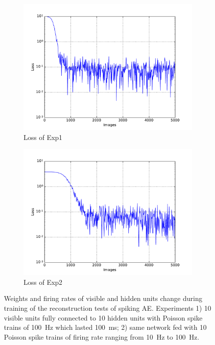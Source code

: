 \begin{figure}
\begin{subfigure}[t]{0.4\textwidth}
		\includegraphics[width=\textwidth]{pics_sdlm/01_exp_SAE_Orig_long/exp1_mse_nons.pdf}
		\caption{Loss of Exp1}
	\end{subfigure}
	\begin{subfigure}[t]{0.4\textwidth}
		\includegraphics[width=\textwidth]{pics_sdlm/01_exp_SAE_Orig_long/exp2_mse_nons.pdf}
		\caption{Loss of Exp2}
	\end{subfigure}
	\caption{Weights and firing rates of visible and hidden units change during training of the reconstruction tests of spiking AE. 
		Experiments 1) 10 visible units fully connected to 10 hidden units with Poisson spike trains of 100~Hz which lasted 100~ms; 2) same network fed with 10 Poisson spike trains of firing rate ranging from 10~Hz to 100~Hz.}
\end{figure}

